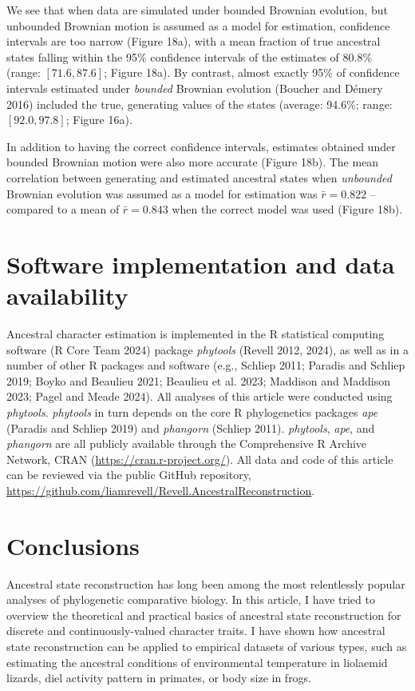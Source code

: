 \documentclass{article}
\begin{document}
We see that when data are simulated under bounded Brownian evolution, but unbounded Brownian motion is assumed as a model for estimation, confidence intervals are too narrow (Figure 18a), with a mean fraction of true ancestral states falling within the 95\% confidence intervals of the estimates of 80.8\% (range: \([71.6, 87.6]\); Figure 18a). By contrast, almost exactly 95\% of confidence intervals estimated under \emph{bounded} Brownian evolution (Boucher and Démery 2016) included the true, generating values of the states (average: 94.6\%; range: \([92.0, 97.8]\); Figure 16a).

In addition to having the correct confidence intervals, estimates obtained under bounded Brownian motion were also more accurate (Figure 18b). The mean correlation between generating and estimated ancestral states when \emph{unbounded} Brownian evolution was assumed as a model for estimation was \(\bar{r} = 0.822\) -- compared to a mean of \(\bar{r} = 0.843\) when the correct model was used (Figure 18b).

\section{Software implementation and data availability}\label{software-implementation-and-data-availability}

Ancestral character estimation is implemented in the R statistical computing software (R Core Team 2024) package \emph{phytools} (Revell 2012, 2024), as well as in a number of other R packages and software (e.g., Schliep 2011; Paradis and Schliep 2019; Boyko and Beaulieu 2021; Beaulieu et al. 2023; Maddison and Maddison 2023; Pagel and Meade 2024). All analyses of this article were conducted using \emph{phytools}. \emph{phytools} in turn depends on the core R phylogenetics packages \emph{ape} (Paradis and Schliep 2019) and \emph{phangorn} (Schliep 2011). \emph{phytools}, \emph{ape}, and \emph{phangorn} are all publicly available through the Comprehensive R Archive Network, CRAN (\url{https://cran.r-project.org/}). All data and code of this article can be reviewed via the public GitHub repository, \url{https://github.com/liamrevell/Revell.AncestralReconstruction}.

\section{Conclusions}\label{conclusions}

Ancestral state reconstruction has long been among the most relentlessly popular analyses of phylogenetic comparative biology. In this article, I have tried to overview the theoretical and practical basics of ancestral state reconstruction for discrete and continuously-valued character traits. I have shown how ancestral state reconstruction can be applied to empirical datasets of various types, such as estimating the ancestral conditions of environmental temperature in liolaemid lizards, diel activity pattern in primates, or body size in frogs.
\end{document}
